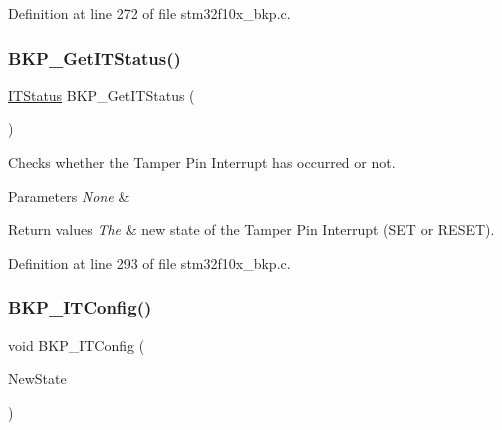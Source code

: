 Definition at line 272 of file stm32f10x\+\_\+bkp.\+c.

\mbox{\label{group___b_k_p___private___functions_ga99566c9f1f17f499020606cb63511494}} 
\subsubsection{\texorpdfstring{B\+K\+P\+\_\+\+Get\+I\+T\+Status()}{BKP\_GetITStatus()}}
{\footnotesize\ttfamily \hyperlink{group___exported__types_gaacbd7ed539db0aacd973a0f6eca34074}{I\+T\+Status} B\+K\+P\+\_\+\+Get\+I\+T\+Status (\begin{DoxyParamCaption}\item[{void}]{ }\end{DoxyParamCaption})}



Checks whether the Tamper Pin Interrupt has occurred or not. 


\begin{DoxyParams}{Parameters}
{\em None} & \\
\hline
\end{DoxyParams}

\begin{DoxyRetVals}{Return values}
{\em The} & new state of the Tamper Pin Interrupt (S\+ET or R\+E\+S\+ET). \\
\hline
\end{DoxyRetVals}


Definition at line 293 of file stm32f10x\+\_\+bkp.\+c.

\mbox{\label{group___b_k_p___private___functions_gab8dbd0c4773f6edb98a28c8ff6a2ead0}} 
\subsubsection{\texorpdfstring{B\+K\+P\+\_\+\+I\+T\+Config()}{BKP\_ITConfig()}}
{\footnotesize\ttfamily void B\+K\+P\+\_\+\+I\+T\+Config (\begin{DoxyParamCaption}\item[{\hyperlink{group___exported__types_gac9a7e9a35d2513ec15c3b537aaa4fba1}{Functional\+State}}]{New\+State }\end{DoxyParamCaption})}



